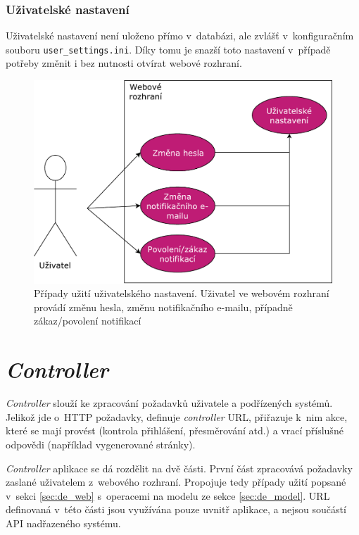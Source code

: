 \subsubsection{Uživatelské nastavení}
\label{sec:de_user_settings}


Uživatelské nastavení není uloženo přímo v~databázi, ale zvlášť v~konfiguračním souboru \texttt{user\_settings.ini}. Díky tomu je snazší toto nastavení v~případě potřeby změnit i bez nutnosti otvírat webové rozhraní.

\begin{figure}[h!]
    \centering
    \includegraphics[width=\textwidth]{images/use_case_user.pdf}
    \caption[Případy užití uživatelského nastavení]{Případy užití uživatelského nastavení. Uživatel ve webovém rozhraní provádí změnu hesla, změnu notifikačního e-mailu, případně zákaz/povolení notifikací}
    \label{fig:use_case_user}
\end{figure}


\section{\textit{Controller}}

\textit{Controller} slouží ke zpracování požadavků uživatele a podřízených systémů. Jelikož jde o~HTTP požadavky, definuje \textit{controller} URL, přiřazuje k~nim akce, které se mají provést (kontrola přihlášení, přesměrování atd.) a vrací příslušné odpovědi (například vygenerované stránky).

\textit{Controller} aplikace se dá rozdělit na dvě části. První část zpracovává požadavky zaslané uživatelem z~webového rozhraní. Propojuje tedy případy užití popsané v~sekci \ref{sec:de_web} s~operacemi na modelu ze sekce \ref{sec:de_model}. URL definovaná v~této části jsou využívána pouze uvnitř aplikace, a nejsou součástí API nadřazeného systému.

